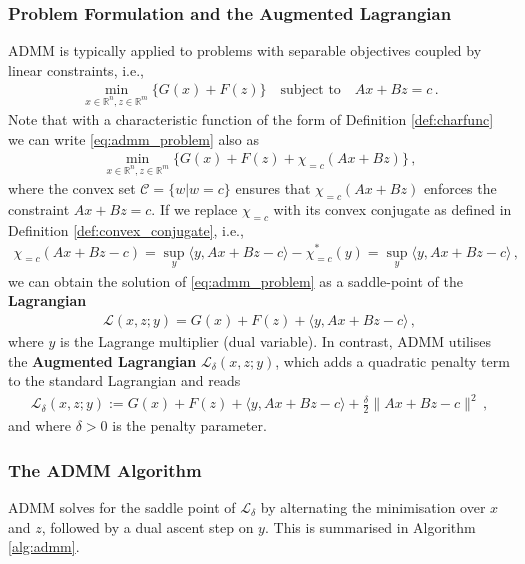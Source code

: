 \subsubsection{Problem Formulation and the Augmented Lagrangian}
ADMM is typically applied to problems with separable objectives coupled by linear constraints, i.e.,
\begin{align}
\min_{x \in \mathbb{R}^n, z \in \mathbb{R}^m} \{ G(x) + F(z) \} \quad \text{subject to} \quad Ax + Bz = c \, . \label{eq:admm_problem}
\end{align}
Note that with a characteristic function of the form of Definition \ref{def:charfunc} we can write \eqref{eq:admm_problem} also as
\begin{align*}
    \min_{x \in \mathbb{R}^n, z \in \mathbb{R}^m} \{ G(x) + F(z) + \chi_{= c}(Ax + Bz) \} \, ,
\end{align*}
where the convex set $\mathcal{C} = \{ w | w = c\}$ ensures that $\chi_{= c}(Ax + Bz)$ enforces the constraint $Ax + Bz = c$. If we replace $\chi_{= c}$ with its convex conjugate as defined in Definition \ref{def:convex_conjugate}, i.e., 
\begin{align*}
    \chi_{= c}(Ax + Bz - c) = \sup_{y} \langle y, Ax + Bz - c \rangle - \chi^\ast_{= c}(y) = \sup_{y} \langle y, Ax + Bz - c \rangle \, ,
\end{align*}
we can obtain the solution of \eqref{eq:admm_problem} as a saddle-point of the \textbf{Lagrangian}
\begin{align*}
    \mathcal{L}(x, z; y) = G(x) + F(z) + \langle y, Ax + Bz - c \rangle \, ,
\end{align*}
where $y$ is the Lagrange multiplier (dual variable). In contrast, ADMM utilises the \textbf{Augmented Lagrangian} $\mathcal{L}_\delta(x, z; y)$, which adds a quadratic penalty term to the standard Lagrangian and reads
\begin{align*}
\mathcal{L}_\delta(x, z; y) := G(x) + F(z) + \langle y, Ax + Bz - c \rangle + \frac{\delta}{2}\|Ax + Bz - c\|^2 \, ,
\end{align*}
and where $\delta > 0$ is the penalty parameter.

\subsubsection{The ADMM Algorithm}
ADMM solves for the saddle point of $\mathcal{L}_\delta$ by alternating the minimisation over $x$ and $z$, followed by a dual ascent step on $y$. This is summarised in Algorithm \ref{alg:admm}.

